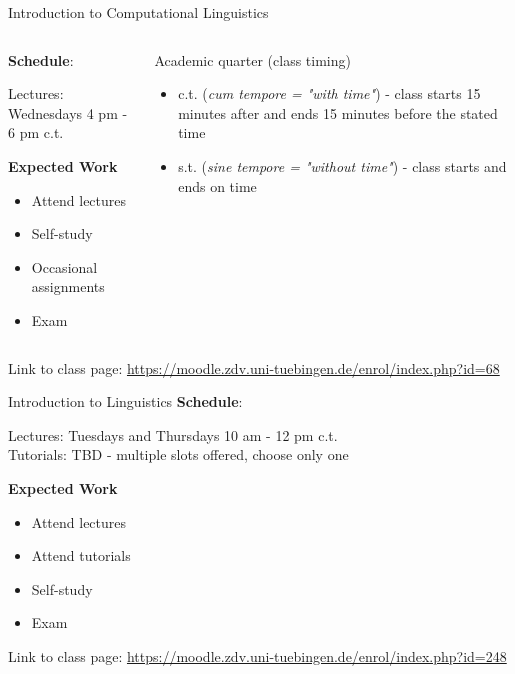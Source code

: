 \documentclass[aspectratio=169,hyperref={unicode},xcolor={dvipsnames}]{beamer}
\begin{document}
\begin{frame}{Introduction to Computational Linguistics}
\begin{columns}
	\begin{column}{0.5\linewidth}
		\textbf{Schedule}:
		
		Lectures: Wednesdays 4 pm - 6 pm c.t.
		\newline
		
		\textbf{Expected Work}
		\begin{itemize}
			\item Attend lectures
			\item Self-study
			\item Occasional assignments
			\item Exam
		\end{itemize}

   	\end{column}
	\begin{column}{0.5\linewidth}
	\begin{alertblock}{Academic quarter (class timing)}
	\begin{itemize}
	 \item c.t. (\textit{cum tempore = "with time"}) - class starts 15 minutes after and ends 15 minutes before the stated time
	 \item s.t. (\textit{sine tempore = "without time"}) - class starts and ends on time
	 \end{itemize}
	 \end{alertblock}
	\end{column}
\end{columns}
\begin{center}
	Link to class page: \url{https://moodle.zdv.uni-tuebingen.de/enrol/index.php?id=68}
\end{center}
\end{frame}

\begin{frame}{Introduction to Linguistics}
		\textbf{Schedule}:
		
		Lectures: Tuesdays and Thursdays 10 am - 12 pm c.t.\\
		Tutorials: TBD - multiple slots offered, choose only one
		\newline
		
		\textbf{Expected Work}
		\begin{itemize}
			\item Attend lectures
			\item Attend tutorials
			\item Self-study
			\item Exam
		\end{itemize}
	\begin{center}
	Link to class page: \url{https://moodle.zdv.uni-tuebingen.de/enrol/index.php?id=248}
\end{center}
\end{frame}
\end{document}
